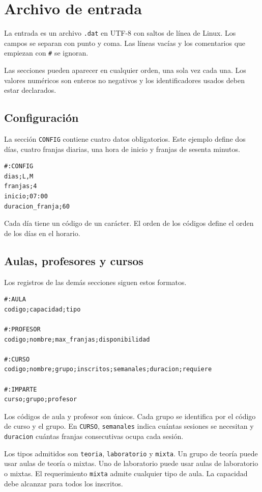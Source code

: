 \documentclass[11pt,a4paper]{article}
\begin{document}
\section{Archivo de entrada}

La entrada es un archivo \texttt{.dat} en UTF-8 con saltos de línea de Linux. Los campos se separan con punto y coma. Las líneas vacías y los comentarios que empiezan con \texttt{\#} se ignoran.

Las secciones pueden aparecer en cualquier orden, una sola vez cada una. Los valores numéricos son enteros no negativos y los identificadores usados deben estar declarados.

\subsection{Configuración}

La sección \texttt{CONFIG} contiene cuatro datos obligatorios. Este ejemplo define dos días, cuatro franjas diarias, una hora de inicio y franjas de sesenta minutos.

\begin{lstlisting}
#:CONFIG
dias;L,M
franjas;4
inicio;07:00
duracion_franja;60
\end{lstlisting}

Cada día tiene un código de un carácter. El orden de los códigos define el orden de los días en el horario.

\subsection{Aulas, profesores y cursos}

Los registros de las demás secciones siguen estos formatos.

\begin{lstlisting}
#:AULA
codigo;capacidad;tipo

#:PROFESOR
codigo;nombre;max_franjas;disponibilidad

#:CURSO
codigo;nombre;grupo;inscritos;semanales;duracion;requiere

#:IMPARTE
curso;grupo;profesor
\end{lstlisting}

Los códigos de aula y profesor son únicos. Cada grupo se identifica por el código de curso y el grupo. En \texttt{CURSO}, \texttt{semanales} indica cuántas sesiones se necesitan y \texttt{duracion} cuántas franjas consecutivas ocupa cada sesión.

Los tipos admitidos son \texttt{teoria}, \texttt{laboratorio} y \texttt{mixta}. Un grupo de teoría puede usar aulas de teoría o mixtas. Uno de laboratorio puede usar aulas de laboratorio o mixtas. El requerimiento \texttt{mixta} admite cualquier tipo de aula. La capacidad debe alcanzar para todos los inscritos.
\end{document}
